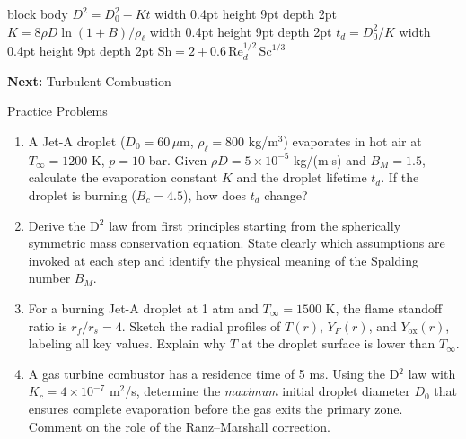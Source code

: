\documentclass[12pt,aspectratio=169]{beamer}
\begin{document}
{\begin{frame}[plain, c]
  \vspace{0.30cm}

  \begin{beamercolorbox}[rounded=true,wd=\textwidth,
                         sep=5pt,center]{block body}
    \color{skyblue!80}\fontsize{7.8}{10}\selectfont
    $D^2 = D_0^2 - Kt$
    \quad\vrule width 0.4pt height 9pt depth 2pt\quad
    $K = 8\rho D\ln(1+B)/\rho_\ell$
    \quad\vrule width 0.4pt height 9pt depth 2pt\quad
    $t_d = D_0^2/K$
    \quad\vrule width 0.4pt height 9pt depth 2pt\quad
    $\mathrm{Sh} = 2 + 0.6\,\mathrm{Re}_d^{1/2}\,\mathrm{Sc}^{1/3}$
  \end{beamercolorbox}

  \vspace{0.22cm}
  \begin{center}
    {\color{white!50}\fontsize{7.5}{9}\selectfont
     \textbf{Next:}\enspace
     Turbulent Combustion}
  \end{center}
\end{frame}
}

\appendix
\begin{frame}{Practice Problems}
  \begin{enumerate}
    \item A Jet-A droplet ($D_0 = 60\,\mu$m, $\rho_\ell = 800$ kg/m$^3$)
          evaporates in hot air at $T_\infty = 1200$ K, $p = 10$ bar.
          Given $\rho D = 5\times10^{-5}$ kg/(m$\cdot$s) and
          $B_M = 1.5$, calculate the evaporation constant $K$ and the
          droplet lifetime $t_d$.
          If the droplet is burning ($B_c = 4.5$), how does $t_d$
          change?

    \item Derive the D$^2$ law from first principles starting from the
          spherically symmetric mass conservation equation.
          State clearly which assumptions are invoked at each step and
          identify the physical meaning of the Spalding number $B_M$.

    \item For a burning Jet-A droplet at 1 atm and $T_\infty = 1500$ K,
          the flame standoff ratio is $r_f/r_s = 4$.
          Sketch the radial profiles of $T(r)$, $Y_F(r)$, and
          $Y_{\text{ox}}(r)$, labeling all key values.
          Explain why $T$ at the droplet surface is lower than $T_\infty$.

    \item A gas turbine combustor has a residence time of 5 ms.
          Using the D$^2$ law with $K_c = 4\times10^{-7}$ m$^2$/s,
          determine the \emph{maximum} initial droplet diameter $D_0$
          that ensures complete evaporation before the gas exits the
          primary zone.
          Comment on the role of the Ranz--Marshall correction.
  \end{enumerate}
\end{frame}
\end{document}
